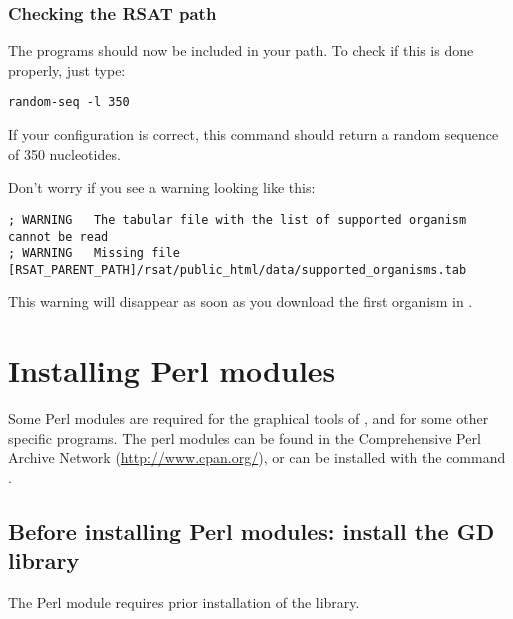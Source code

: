 \documentclass[12pt,a4paper, oneside]{scrreprt} %
\begin{document}
\subsection{Checking the RSAT path}

The \RSAT programs should now be included in your path.  To check if
this is done properly, just type:

\begin{lstlisting}
random-seq -l 350
\end{lstlisting}

If your configuration is correct, this command should return a random
sequence of 350 nucleotides.

Don't worry if you see a warning looking like this:

\begin{footnotesize}
\begin{verbatim}
; WARNING	The tabular file with the list of supported organism cannot be read
; WARNING	Missing file	[RSAT_PARENT_PATH]/rsat/public_html/data/supported_organisms.tab
\end{verbatim}
\end{footnotesize}

This warning will disappear as soon as you download the first organism
in \RSAT.


\chapter{Installing Perl modules}
\label{chap:perl_modules}

Some Perl modules are required for the graphical tools of \RSAT, and
for some other specific programs. The perl modules can be found in the
Comprehensive Perl Archive Network (\url{http://www.cpan.org/}), or
can be installed with the command .

\section{Before installing Perl modules: install the GD library}

The Perl module  requires prior installation of the
 library.
\end{document}
